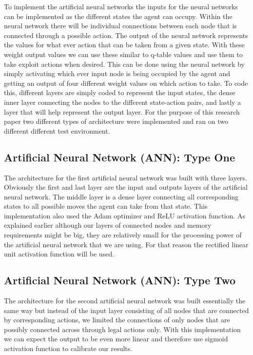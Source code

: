 \documentclass[letterpaper]{article}
\begin{document}
\indent  To implement the artificial neural networks the inputs for the neural  networks can be implemented as the different states the agent can occupy. Within the neural network there will be individual connections between each node that is connected through a possible action. The output of the neural network represents the values for what ever action that can be taken from a given state. With these weight output values we can use these similar to q-table values and use them to take exploit actions when desired.  This can be done using the neural network by simply activating which ever input node is being occupied by the agent and getting an output of four different weight values on which action to take. To code this, different layers are simply coded to represent the input states, the dense inner layer connecting the nodes to the different state-action pairs, and lastly a layer that will help represent the output layer. For the purpose of this research paper two different types of architecture were implemented and ran on two different different test environment.\\

\subsection{Artificial Neural Network (ANN): Type One}
The architecture for the first artificial neural network was built with three layers.  Obviously the first and last layer are the input and outputs layers of the artificial neural network. The middle layer is a dense layer connecting all corresponding states to all possible moves the agent can take from that state.  This implementation also used the Adam optimizer and ReLU activation function.  As explained earlier although our layers of connected nodes and memory requirements might be big, they are relatively small for the processing power of the artificial neural network that we are using.  For that reason the rectified linear unit activation function will be used.   

\subsection{Artificial Neural Network (ANN): Type Two}
The architecture for the second artificial neural network was built essentially the same way but instead of the input layer consisting of all nodes that are connected by corresponding  actions, we limited the connections of only nodes that are possibly connected across through legal actions only.  With this implementation we can expect the output to be even more linear and therefore use sigmoid activation function to calibrate our results. 
\end{document}
